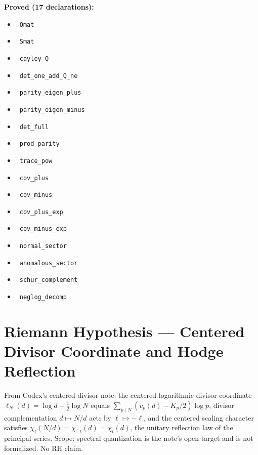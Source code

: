 \documentclass{report}
\theoremstyle{definition}
\begin{document}
\noindent\textbf{Proved (17 declarations):}
\begin{itemize}
  \item {}\leanok\ \texttt{Qmat}
  \item {}\leanok\ \texttt{Smat}
  \item {}\leanok\ \texttt{cayley\_Q}
  \item {}\leanok\ \texttt{det\_one\_add\_Q\_ne}
  \item {}\leanok\ \texttt{parity\_eigen\_plus}
  \item {}\leanok\ \texttt{parity\_eigen\_minus}
  \item {}\leanok\ \texttt{det\_full}
  \item {}\leanok\ \texttt{prod\_parity}
  \item {}\leanok\ \texttt{trace\_pow}
  \item {}\leanok\ \texttt{cov\_plus}
  \item {}\leanok\ \texttt{cov\_minus}
  \item {}\leanok\ \texttt{cov\_plus\_exp}
  \item {}\leanok\ \texttt{cov\_minus\_exp}
  \item {}\leanok\ \texttt{normal\_sector}
  \item {}\leanok\ \texttt{anomalous\_sector}
  \item {}\leanok\ \texttt{schur\_complement}
  \item {}\leanok\ \texttt{neglog\_decomp}
\end{itemize}

\section{Riemann Hypothesis --- Centered Divisor Coordinate and Hodge Reflection}
From Codex's centered-divisor note: the centered logarithmic divisor coordinate $\ell_N(d)=\log d-\tfrac12\log N$ equals $\sum_{p\mid N}(v_p(d)-K_p/2)\log p$, divisor complementation $d\mapsto N/d$ acts by $\ell\mapsto-\ell$, and the centered scaling character satisfies $\chi_t(N/d)=\chi_{-t}(d)=\overline{\chi_t(d)}$, the unitary reflection law of the principal series. Scope: spectral quantization is the note's open target and is not formalized. No RH claim.
\end{document}
